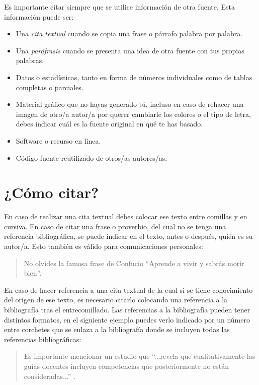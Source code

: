 Es importante citar siempre que se utilice información de otra fuente. Esta información puede ser:

\begin{itemize}
    \item Una {\em cita textual} cuando se copia una frase o párrafo palabra por palabra.
    \item Una {\em paráfrasis} cuando se presenta una idea de otra fuente con tus propias palabras.
    \item Datos o estadísticas, tanto en forma de números individuales como de tablas completas o parciales.
    \item Material gráfico que no hayas generado tú, incluso en caso de rehacer una imagen de otro/a autor/a por querer cambiarle los colores o el tipo de letra, debes indicar cuál es la fuente original en qué te has basado. 
    \item Software o recurso en línea.
    \item Código fuente reutilizado de otros/as autores/as.
\end{itemize}

\section{¿Cómo citar?}

En caso de realizar una cita textual debes colocar ese texto entre comillas y en cursiva. En caso de citar una frase o proverbio, del cual no se tenga una referencia bibliográfica, se puede indicar en el texto, antes o después, quién es su autor/a. Esto también es válido para comunicaciones personales:

\begin{quote}
\begin{it}
    No olvides la famosa frase de Confucio ``Aprende a vivir y sabrás morir bien''.
\end{it}
\end{quote}

En caso de hacer referencia a una cita textual de la cual si se tiene conocimiento del origen de ese texto, es necesario citarlo colocando una referencia a la bibliografía tras el entrecomillado. Las referencias a la bibliografía pueden tener distintos formatos, en el siguiente ejemplo puedes verlo indicado por un número entre corchetes que se enlaza a la bibliografía donde se incluyen todas las referencias bibliográficas:

\begin{quote}
\begin{it}
     Es importante mencionar un estudio que ``...revela que cualitativamente las guías docentes incluyen competencias que posteriormente no están consideradas...'' \cite{fernandez2023evaluacion}.
\end{it}
\end{quote}

